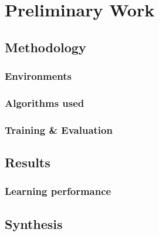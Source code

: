 \chapter{Preliminary Work}
\label{chapter:prw}

\section{Methodology}
\label{section:prw-methodology}

\subsection{Environments}
\label{subsection:prw-env}

\subsection{Algorithms used}
\label{subsection:prw-algorithms}

\subsection{Training \& Evaluation}
\label{subsection:prw-training-and-eval}

\section{Results}
\label{section:prw-results}

\subsection{Learning performance}
\label{subsection:prw-learning-performance}

\section{Synthesis}
\label{section:prw-synthesis}



